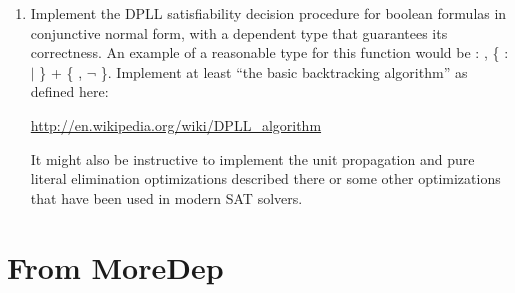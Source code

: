 \documentclass[12pt]{report}
\begin{document}
\begin{enumerate}
\begin{coqdoccode}
\coqdocemptyline
\coqdocnoindent
{} .\coqdoceol
\coqdocemptyline
\end{coqdoccode}
\item Implement the DPLL satisfiability decision procedure for boolean formulas in conjunctive normal form, with a dependent type that guarantees its correctness.  An example of a reasonable type for this function would be \coqdockw{\ensuremath{\forall}}  : , \{ :  \ensuremath{|}   \} + \{\coqdockw{\ensuremath{\forall}} , \ensuremath{\lnot}   \}.  Implement at least ``the basic backtracking algorithm'' as defined here:
  \begin{center}\url{http://en.wikipedia.org/wiki/DPLL_algorithm}\end{center}
  
It might also be instructive to implement the unit propagation and pure literal elimination optimizations described there or some other optimizations that have been used in modern SAT solvers.


\end{enumerate} 

\section{From MoreDep}
\end{document}

